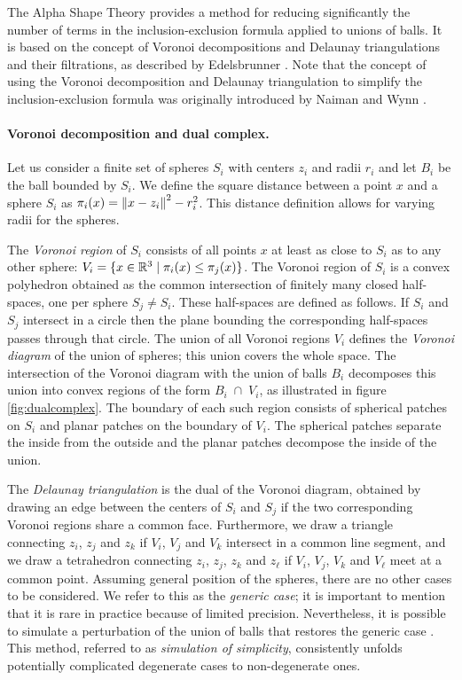 \documentclass[11 pt]{article}
\newcommand {\mm}[1] {\ifmmode{#1}\else{\mbox{\(#1\)}}\fi}
\theoremstyle{plain} \theorembodyfont{\rmfamily}
\newcommand{\Rspace}        {\mm{{\mathbb R}}}
\newcommand{\capsp}         {{\; \cap \;}}
\newcommand{\dist}[2]       {\mm{\|{#1}-{#2}\|}}
\begin{document}
The Alpha Shape Theory provides a method for reducing significantly the number of terms in the inclusion-exclusion formula applied to unions of balls.
It is based on the concept of Voronoi decompositions and Delaunay triangulations
and their filtrations, as described by Edelsbrunner \cite{Ede95}. 
Note that the concept of using the Voronoi decomposition and Delaunay triangulation to simplify the inclusion-exclusion formula was originally introduced by Naiman and Wynn \cite{NaWy92}.

\paragraph{Voronoi decomposition and dual complex.}
Let us consider a finite set of spheres $S_i$ with centers $z_i$
and radii $r_i $ and let $B_i$ be the ball bounded by $S_i$.
We define the square distance between a point $x$
and a sphere $S_i$ as $\pi_i (x) = \dist{x}{z_i}^2 - r_i^2$.
This distance definition allows for varying radii for the spheres.


The \emph{Voronoi region} of $S_i$ consists of all points $x$
at least as close to $S_i$ as to any other sphere:
$V_i  =  \{ x \in \Rspace^3  \mid  \pi_i (x) \leq \pi_j (x) \}$.
The Voronoi region of $S_i$ is a convex polyhedron obtained as the
common intersection of finitely many closed half-spaces,
one per sphere $S_j \neq S_i$. These half-spaces are defined as follows.
If $S_i$ and $S_j$ intersect in a circle then the plane bounding
the corresponding half-spaces passes through that circle.
The union of all Voronoi regions $V_i$ defines the \emph{Voronoi diagram} of the union of spheres;
this union covers the whole space.
The intersection of the Voronoi diagram with the union of balls $B_i$
decomposes this union into convex regions of
the form $B_i \capsp V_i$, as illustrated in figure \ref{fig:dualcomplex}.
The boundary of each such region consists of spherical patches on $S_i$
and planar patches on the boundary of $V_i$.
The spherical patches separate the inside from the outside and
the planar patches decompose the inside of the union.

The \emph{Delaunay triangulation} is the dual of the Voronoi diagram,
obtained by drawing an edge between the centers of $S_i$ and $S_j$
if the two corresponding Voronoi regions share a common face.
Furthermore, we draw a triangle connecting $z_i$, $z_j$ and $z_k$ if
$V_i$, $V_j$ and $V_k$ intersect in a common line segment,
and we draw a tetrahedron connecting $z_i$, $z_j$, $z_k$ and $z_\ell$
if $V_i$, $V_j$, $V_k$ and $V_\ell$ meet at a common point.
Assuming general position of the spheres, there are no other cases
to be considered.
We refer to this as the \emph{generic case}; it is important to mention that it is rare
in practice because of limited precision.
Nevertheless, it is possible to simulate a perturbation of the union of balls
that restores the generic case \cite{EdMu90}.
This method, referred to as \emph{simulation of simplicity},
consistently unfolds potentially complicated degenerate cases to non-degenerate ones.
\end{document}
